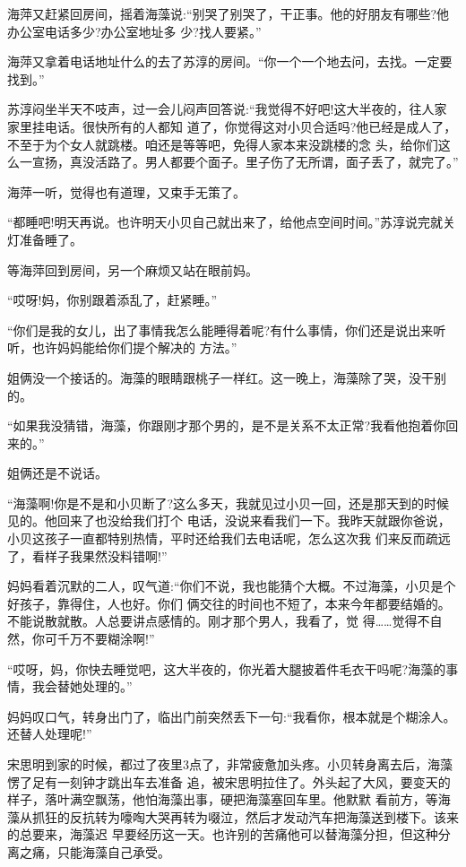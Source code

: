 \documentclass[11pt,a4paper,onecolumn]{article}
\begin{document}
海萍又赶紧回房间，摇着海藻说:``别哭了别哭了，干正事。他的好朋友有哪些?他办公室电话多少?办公室地址多
少?找人要紧。''

海萍又拿着电话地址什么的去了苏淳的房间。``你一个一个地去问，去找。一定要找到。''

苏淳闷坐半天不吱声，过一会儿闷声回答说:``我觉得不好吧!这大半夜的，往人家家里挂电话。很快所有的人都知
道了，你觉得这对小贝合适吗?他已经是成人了，不至于为个女人就跳楼。咱还是等等吧，免得人家本来没跳楼的念
头，给你们这么一宣扬，真没活路了。男人都要个面子。里子伤了无所谓，面子丢了，就完了。''

海萍一听，觉得也有道理，又束手无策了。

``都睡吧!明天再说。也许明天小贝自己就出来了，给他点空间时间。''苏淳说完就关灯准备睡了。

等海萍回到房间，另一个麻烦又站在眼前\myrule 妈。

``哎呀!妈，你别跟着添乱了，赶紧睡。''

``你们是我的女儿，出了事情我怎么能睡得着呢?有什么事情，你们还是说出来听听，也许妈妈能给你们提个解决的
方法。''

姐俩没一个接话的。海藻的眼睛跟桃子一样红。这一晚上，海藻除了哭，没干别的。

``如果我没猜错，海藻，你跟刚才那个男的，是不是关系不太正常?我看他抱着你回来的。''

姐俩还是不说话。

``海藻啊!你是不是和小贝断了?这么多天，我就见过小贝一回，还是那天到的时候见的。他回来了也没给我们打个
电话，没说来看我们一下。我昨天就跟你爸说，小贝这孩子一直都特别热情，平时还给我们去电话呢，怎么这次我
们来反而疏远了，看样子我果然没料错啊!''

妈妈看着沉默的二人，叹气道:``你们不说，我也能猜个大概。不过海藻，小贝是个好孩子，靠得住，人也好。你们
俩交往的时间也不短了，本来今年都要结婚的。不能说散就散。人总要讲点感情的。刚才那个男人，我看了，觉
得……觉得不自然，你可千万不要糊涂啊!''

``哎呀，妈，你快去睡觉吧，这大半夜的，你光着大腿披着件毛衣干吗呢?海藻的事情，我会替她处理的。''

妈妈叹口气，转身出门了，临出门前突然丢下一句:``我看你，根本就是个糊涂人。还替人处理呢!''

宋思明到家的时候，都过了夜里3点了，非常疲惫加头疼。小贝转身离去后，海藻愣了足有一刻钟才跳出车去准备
追，被宋思明拉住了。外头起了大风，要变天的样子，落叶满空飘荡，他怕海藻出事，硬把海藻塞回车里。他默默
看前方，等海藻从抓狂的反抗转为嚎啕大哭再转为啜泣，然后才发动汽车把海藻送到楼下。该来的总要来，海藻迟
早要经历这一天。也许别的苦痛他可以替海藻分担，但这种分离之痛，只能海藻自己承受。
\end{document}
